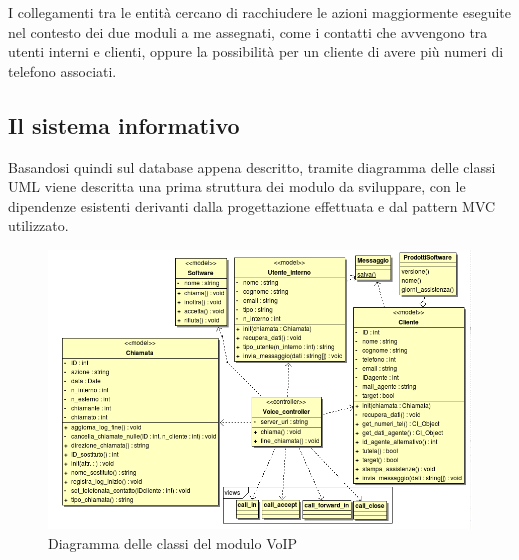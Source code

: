 I collegamenti tra le entit\`a cercano di racchiudere le azioni maggiormente eseguite nel contesto dei due moduli a me assegnati, come i
contatti che avvengono tra utenti interni e clienti, oppure la possibilit\`a per un cliente di avere pi\`u numeri di telefono associati.

\subsection{Il sistema informativo}
Basandosi quindi sul database appena descritto, tramite diagramma delle classi UML viene descritta una prima struttura dei modulo da 
sviluppare, con le dipendenze esistenti derivanti dalla progettazione effettuata e dal pattern MVC utilizzato.

\begin{figure}[!ht]
\label{voip}
\centering
  \includegraphics[scale=0.7]{./images/VoIPMVC.png}
\caption{Diagramma delle classi del modulo VoIP}
\end{figure}

